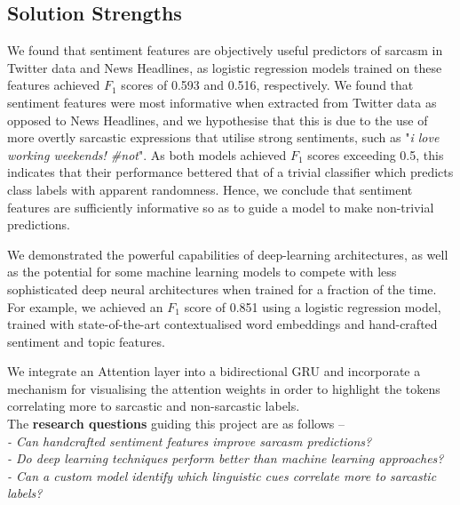 \documentclass[12pt,a4paper]{article}
\begin{document}
\subsection{Solution Strengths}\vspace{-10pt}
\noindent We found that sentiment features are objectively useful predictors of sarcasm in Twitter data and News Headlines, as logistic regression models trained on these features achieved $F_1$ scores of 0.593 and 0.516, respectively. We found that sentiment features were most informative when extracted from Twitter data as opposed to News Headlines, and we hypothesise that this is due to the use of more overtly sarcastic expressions that utilise strong sentiments, such as "\textit{i love working weekends! \#not}". As both models achieved $F_1$ scores exceeding 0.5, this indicates that their performance bettered that of a trivial classifier which predicts class labels with apparent randomness. Hence, we conclude that sentiment features are sufficiently informative so as to guide a model to make non-trivial predictions.

We demonstrated the powerful capabilities of deep-learning architectures, as well as the potential for some machine learning models to compete with less sophisticated deep neural architectures when trained for a fraction of the time. For example, we achieved an $F_1$ score of 0.851 using a logistic regression model, trained with state-of-the-art contextualised word embeddings and hand-crafted sentiment and topic features.

We integrate an Attention layer into a bidirectional GRU and incorporate a mechanism for visualising the attention weights in order to highlight the tokens correlating more to sarcastic and non-sarcastic labels.\\


\noindent The \textbf{research questions} guiding this project are as follows --\\
\indent \textit{- Can handcrafted sentiment features improve sarcasm predictions?}\\ 
\indent \textit{- Do deep learning techniques perform better than machine learning approaches?}\\ 
\indent \textit{- Can a custom model identify which linguistic cues correlate more to sarcastic labels?}\\
\end{document}
